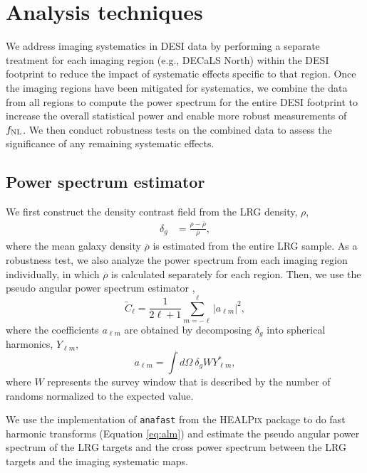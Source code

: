 \section{Analysis techniques}
\label{sec:method} 
We address imaging systematics in DESI data by performing a separate treatment for each imaging region (e.g., DECaLS North) within the DESI footprint to reduce the impact of systematic effects specific to that region. Once the imaging regions have been mitigated for systematics, we combine the data from all regions to compute the power spectrum for the entire DESI footprint to increase the overall statistical power and enable more robust measurements of $f_{\rm NL}$. We then conduct robustness tests on the combined data to assess the significance of any remaining systematic effects.


\subsection{Power spectrum estimator}
We first construct the density contrast field from the LRG density, $\rho$,
\begin{align}\label{eq:delta}
    \delta_{g} &= \frac{\rho- \overline{\rho}}{\overline{\rho}},
\end{align}
where the mean galaxy density $\overline{\rho}$ is estimated from the entire LRG sample. As a robustness test, we also analyze the power spectrum from each imaging region individually, in which $\overline{\rho}$ is calculated separately for each region. Then, we use the pseudo angular power spectrum estimator \citep{hivon2002master},
\begin{equation}\label{eq:pusedocell}
        \tilde{C}_{\ell} = \frac{1}{2\ell +1} \sum_{m=-\ell}^{\ell} |a_{\ell m}|^{2},
\end{equation}
where the coefficients $a_{\ell m}$ are obtained by decomposing $\delta_{g}$ into spherical harmonics, $Y_{\ell m}$,
\begin{equation}\label{eq:alm}
        a_{\ell m} = \int d\Omega ~ \delta_{g} W Y^{*}_{\ell m},
\end{equation}
where $W$ represents the survey window that is described by the number of randoms normalized to the expected value.

We use the implementation of \texttt{anafast} from the \textsc{HEALPix} package \citep{gorski2005healpix} to do fast harmonic transforms (Equation \ref{eq:alm}) and estimate the pseudo angular power spectrum of the LRG targets and the cross power spectrum between the LRG targets and the imaging systematic maps.

